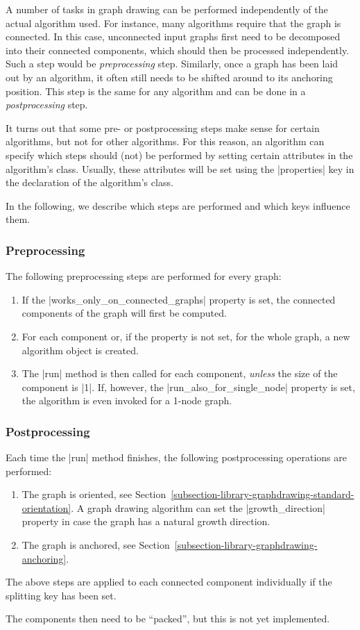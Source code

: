 A number of tasks in graph drawing can be performed independently of
the actual algorithm used. For instance, many algorithms require that
the graph is connected. In this case, unconnected input graphs first
need to be decomposed into their connected components, which should
then be processed independently. Such a step would be
\emph{preprocessing} step. Similarly, once a graph has been laid out
by an algorithm, it often still needs to be shifted around to its
anchoring position. This step is the same for any algorithm and can be
done in a \emph{postprocessing} step.

It turns out that some pre- or postprocessing steps make sense for
certain algorithms, but not for other algorithms. For this reason, an
algorithm can specify which steps should (not) be performed by setting
certain attributes in the algorithm's class. Usually, these attributes
will be set using the |properties| key in the declaration of the
algorithm's class.

In the following, we describe which steps are performed and which keys
influence them.


\subsubsection{Preprocessing}

The following preprocessing steps are performed for every graph:
\begin{enumerate}
\item If the |works_only_on_connected_graphs| property is set, the
  connected components of the graph will first be computed.
\item For each component or, if the property is not set, for the whole
  graph, a new algorithm object is created.
\item The |run| method is then called for each component,
  \emph{unless} the size of the component is |1|. If, however, the
  |run_also_for_single_node| property is set, the algorithm is even
  invoked for a 1-node graph.
\end{enumerate}

\subsubsection{Postprocessing}

Each time the |run| method finishes, the following postprocessing
operations are performed:
\begin{enumerate}
\item The graph is oriented, see
  Section~\ref{subsection-library-graphdrawing-standard-orientation}. A
  graph drawing algorithm can set the |growth_direction| property in
  case the graph has a natural growth direction.
\item The graph is anchored, see
  Section~\ref{subsection-library-graphdrawing-anchoring}. 
\end{enumerate}
The above steps are applied to each connected component individually
if the splitting key has been set.

The components then need to be ``packed'', but this is not yet
implemented.



